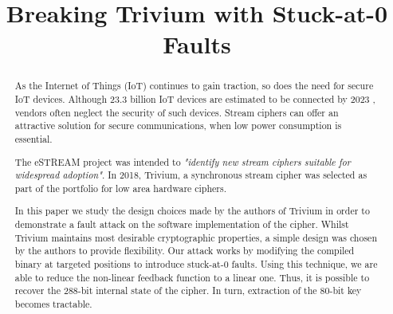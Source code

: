 \documentclass[conference]{IEEEtran}
\begin{document}
\title{Breaking Trivium with Stuck-at-0 Faults}

\author{
\and
{}
\and
{}
}

\maketitle

\begin{abstract}
As the Internet of Things (IoT) continues to gain traction, so does the need for secure IoT devices. Although 23.3 billion IoT devices are estimated to be connected by 2023 \cite{iot}, vendors often neglect the security of such devices. Stream ciphers can offer an attractive solution for secure communications, when low power consumption is essential. 

The eSTREAM project was intended to \textit{"identify new stream ciphers suitable for widespread adoption"}.\cite{call} In 2018, Trivium, a synchronous stream cipher was selected as part of the portfolio for low area hardware ciphers. 

In this paper we study the design choices made by the authors of Trivium in order to demonstrate a fault attack on the software implementation of the cipher. Whilst Trivium maintains most desirable cryptographic properties, a simple design was chosen by the authors to provide flexibility. Our attack works by modifying the compiled binary at targeted positions to introduce stuck-at-0 faults. Using this technique, we are able to reduce the non-linear feedback function to a linear one. Thus, it is possible to recover the 288-bit internal state of the cipher. In turn, extraction of the 80-bit key becomes tractable.
\end{abstract}
\end{document}
